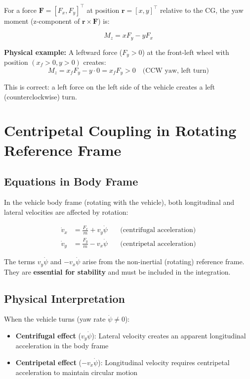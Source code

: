 \documentclass[11pt,a4paper]{article}
\begin{document}
For a force $\bm{F} = [F_x, F_y]^\top$ at position $\bm{r} = [x, y]^\top$ relative to the CG, the yaw moment (z-component of $\bm{r} \times \bm{F}$) is:

\begin{equation}
M_z = x F_y - y F_x
\label{eq:cross_product}
\end{equation}

\textbf{Physical example:} A leftward force ($F_y > 0$) at the front-left wheel with position $(x_f > 0, y > 0)$ creates:
\begin{equation}
M_z = x_f F_y - y \cdot 0 = x_f F_y > 0 \quad \text{(CCW yaw, left turn)}
\end{equation}

This is correct: a left force on the left side of the vehicle creates a left (counterclockwise) turn.

\section{Centripetal Coupling in Rotating Reference Frame}

\subsection{Equations in Body Frame}

In the vehicle body frame (rotating with the vehicle), both longitudinal and lateral velocities are affected by rotation:

\begin{align}
\dot{v}_x &= \frac{F_x}{m} + v_y \dot{\psi} \quad &\text{(centrifugal acceleration)} \\
\dot{v}_y &= \frac{F_y}{m} - v_x \dot{\psi} \quad &\text{(centripetal acceleration)}
\end{align}

The terms $v_y \dot{\psi}$ and $-v_x \dot{\psi}$ arise from the non-inertial (rotating) reference frame. They are \textbf{essential for stability} and must be included in the integration.

\subsection{Physical Interpretation}

When the vehicle turns (yaw rate $\dot{\psi} \neq 0$):
\begin{itemize}
    \item \textbf{Centrifugal effect} ($v_y \dot{\psi}$): Lateral velocity creates an apparent longitudinal acceleration in the body frame
    \item \textbf{Centripetal effect} ($-v_x \dot{\psi}$): Longitudinal velocity requires centripetal acceleration to maintain circular motion
\end{itemize}
\end{document}
